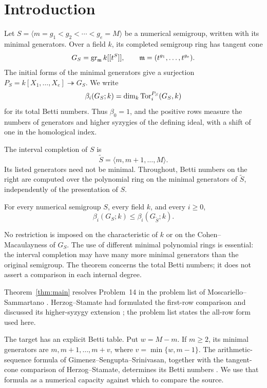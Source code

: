 \section{Introduction}
\label{sec:introduction}
Let $S=\langle m=g_1<g_2<\cdots<g_e=M\rangle$ be a numerical
semigroup, written with its minimal generators. Over a field $k$, its
completed semigroup ring has tangent cone
\[
 G_S=\operatorname{gr}_{\mathfrak m} k[[t^S]],\qquad
 \mathfrak m=(t^{g_1},\ldots,t^{g_e}).
\]
The initial forms of the minimal generators give a surjection
$P_S=k[X_1,\ldots,X_e]\twoheadrightarrow G_S$.
We write
\[
 \beta_i(G_S;k)=\dim_k\operatorname{Tor}_i^{P_S}(G_S,k)
\]
for its total Betti numbers. Thus $\beta_0=1$, and the positive rows
measure the numbers of generators and higher syzygies of the defining
ideal, with a shift of one in the homological index.

The interval completion of $S$ is
\[
 \widetilde S=\langle m,m+1,\ldots,M\rangle.
\]
Its listed generators need not be minimal. Throughout, Betti numbers
on the right are computed over the polynomial ring on the minimal
generators of $\widetilde S$, independently of the presentation of $S$.

\begin{theorem}\label{thm:main}
For every numerical semigroup $S$, every field $k$, and every $i\ge0$,
\[
 \beta_i(G_S;k)\le\beta_i(G_{\widetilde S};k).
\]
\end{theorem}

No restriction is imposed on the characteristic of $k$ or on the
Cohen--Macaulayness of $G_S$. The use of different minimal polynomial
rings is essential: the interval completion may have many more minimal
generators than the original semigroup. The theorem concerns the total
Betti numbers; it does not assert a comparison in each internal degree.

Theorem~\ref{thm:main} resolves Problem~14 in the problem list of
Moscariello--Sammartano \cite{ProblemList}. Herzog--Stamate had
formulated the first-row comparison and discussed its higher-syzygy
extension \cite{APCone}; the problem list states the all-row form used
here.

The target has an explicit Betti table. Put $w=M-m$. If $m\ge2$, its
minimal generators are $m,m+1,\ldots,m+v$, where
$v=\min\{w,m-1\}$. The arithmetic-sequence formula of
Gimenez--Sengupta--Srinivasan, together with the tangent-cone comparison
of Herzog--Stamate, determines its Betti numbers
\cite{APFormula,APCone}. We use that formula as a numerical capacity
against which to compare the source.

